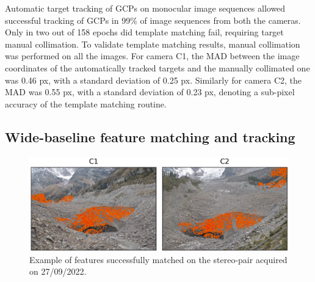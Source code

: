 Automatic target tracking of GCPs on monocular image sequences allowed successful
tracking of GCPs
in 99\% of image sequences from both the cameras.
Only in two out of 158 epochs did template matching fail, requiring target manual
collimation.
To validate template matching results, manual collimation was performed on all the
images.
For camera C1, the MAD between the image coordinates of the automatically tracked targets
and the manually collimated one was 0.46 px, with a standard deviation of 0.25 px.
Similarly for camera C2, the MAD was 0.55 px, with a standard deviation of 0.23 px,
denoting a sub-pixel accuracy of the template matching routine.

\subsection{Wide-baseline feature matching and tracking}\label{sec:4:res_matching}

\begin{figure}
  \includegraphics[width=1.0\linewidth]{4_matches_2022_09_27.png}
  \caption{Example of features successfully matched on the stereo-pair acquired on
    27/09/2022.}
  \label{fig:4:matches}
\end{figure}


